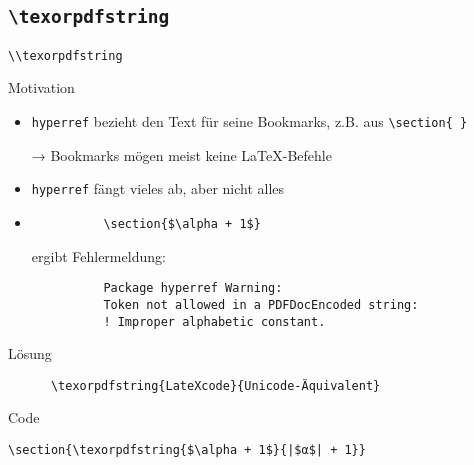 \subsection{\texttt{\textbackslash texorpdfstring}}

\begin{frame}[fragile]{\lstinline+\\texorpdfstring+}
  \begin{block}{Motivation}
    \begin{itemize}
      \item \texttt{hyperref} bezieht den Text für seine Bookmarks, z.B. aus \lstinline+\section{ }+
      \item[→] Bookmarks mögen meist keine \LaTeX-Befehle
      \item \texttt{hyperref} fängt vieles ab, aber nicht alles
      \item
        \begin{lstlisting}
          \section{$\alpha + 1$}
        \end{lstlisting}
        ergibt Fehlermeldung:
        \begin{lstlisting}
          Package hyperref Warning:
          Token not allowed in a PDFDocEncoded string:
          ! Improper alphabetic constant.
        \end{lstlisting}
    \end{itemize}
  \end{block}
  \begin{block}{Lösung}
    \begin{lstlisting}
      \texorpdfstring{LateXcode}{Unicode-Äquivalent}
    \end{lstlisting}
  \end{block}
  \begin{block}{Code}
    \begin{lstlisting}[escapechar=|]
      \section{\texorpdfstring{$\alpha + 1$}{|$α$| + 1}}
    \end{lstlisting}
  \end{block}
\end{frame}
